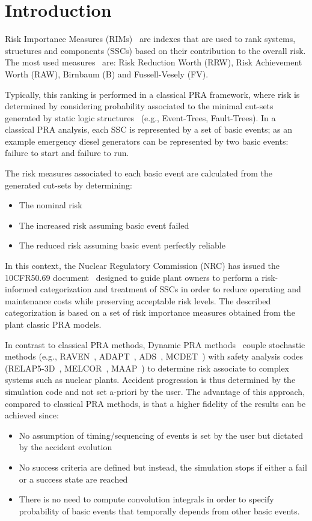 \section{Introduction}
\label{sec:introduction}

Risk Importance Measures (RIMs)~\cite{Nureg3385} are indexes that are used to rank systems, 
structures and components (SSCs) based on their contribution to the overall risk. 
The most used measures~\cite{flemingRiskImportance} are: 
Risk Reduction Worth (RRW), Risk Achievement Worth (RAW), Birnbaum (B) and Fussell-Vesely (FV).

Typically, this ranking is performed in a classical PRA framework, where risk is determined by 
considering probability associated to the minimal cut-sets generated by static logic 
structures~\cite{Nureg1150} (e.g., Event-Trees, Fault-Trees). In a classical PRA analysis, 
each SSC is represented by a set of basic events; as an example emergency diesel generators can be 
represented by two basic events: failure to start and failure to run. 

The risk measures associated to each basic event are calculated from the generated cut-sets 
by determining: 
\begin{itemize}
  \item The nominal risk 
  \item The increased risk assuming basic event failed
  \item The reduced risk assuming basic event perfectly reliable 
\end{itemize}

In this context, the Nuclear Regulatory Commission (NRC) has issued the 10CFR50.69 
document~\cite{} designed to guide plant owners to perform a risk-informed categorization and 
treatment of SSCs in order to reduce operating and maintenance costs while preserving 
acceptable risk levels. The described categorization is based on a set of risk importance 
measures obtained from the plant classic PRA models.

In contrast to classical PRA methods, Dynamic PRA methods~\cite{DEVOOGHT_DynamicPRA} couple 
stochastic methods 
(e.g., RAVEN~\cite{RAVEN_PSAM_2014}, ADAPT~\cite{ADAPT}, ADS~\cite{ADS}, MCDET~\cite{MCDET}) 
with safety analysis 
codes (RELAP5-3D~\cite{relap5}, MELCOR~\cite{Melcor}, MAAP~\cite{maap}) to determine risk 
associate to 
complex systems such as nuclear plants. Accident progression is thus determined by the 
simulation code and not set a-priori by the user. The advantage of this approach, 
compared to classical PRA methods, is that a higher fidelity of the results can be achieved since:
\begin{itemize}
  \item No assumption of timing/sequencing of events is set by the user but dictated by the 
        accident evolution
  \item No success criteria are defined but instead, the simulation stops if either a fail 
        or a success state are reached
  \item There is no need to compute convolution integrals in order to specify probability of 
        basic events that temporally depends from other basic events.
\end{itemize}

